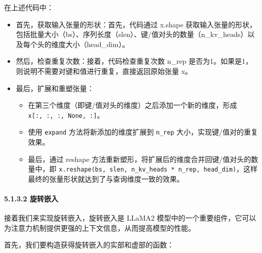\documentclass[
]{article}
\providecommand{\tightlist}{%
  \setlength{\itemsep}{0pt}\setlength{\parskip}{0pt}}
\begin{document}
在上述代码中：

\begin{itemize}
\item
  首先，获取输入张量的形状：首先，代码通过 x.shape
  获取输入张量的形状，包括批量大小（bs）、序列长度（slen）、键/值对头的数量（n\_kv\_heads）以及每个头的维度大小（head\_dim）。
\item
  然后，检查重复次数：接着，代码检查重复次数 n\_rep
  是否为1。如果是1，则说明不需要对键和值进行重复，直接返回原始张量 x。
\item
  最后，扩展和重塑张量：

  \begin{itemize}
  \tightlist
  \item
    在第三个维度（即键/值对头的维度）之后添加一个新的维度，形成
    \texttt{x{[}:,\ :,\ :,\ None,\ :{]}}。
  \item
    使用 \texttt{expand} 方法将新添加的维度扩展到 \texttt{n\_rep}
    大小，实现键/值对的重复效果。
  \item
    最后，通过 reshape
    方法重新塑形，将扩展后的维度合并回键/值对头的数量中，即
    \texttt{x.reshape(bs,\ slen,\ n\_kv\_heads\ *\ n\_rep,\ head\_dim)}，这样最终的张量形状就达到了与查询维度一致的效果。
  \end{itemize}
\end{itemize}

\paragraph{5.1.3.2 旋转嵌入}\label{ux65cbux8f6cux5d4cux5165}

接着我们来实现旋转嵌入，旋转嵌入是 LLaMA2
模型中的一个重要组件，它可以为注意力机制提供更强的上下文信息，从而提高模型的性能。

首先，我们要构造获得旋转嵌入的实部和虚部的函数：
\end{document}
